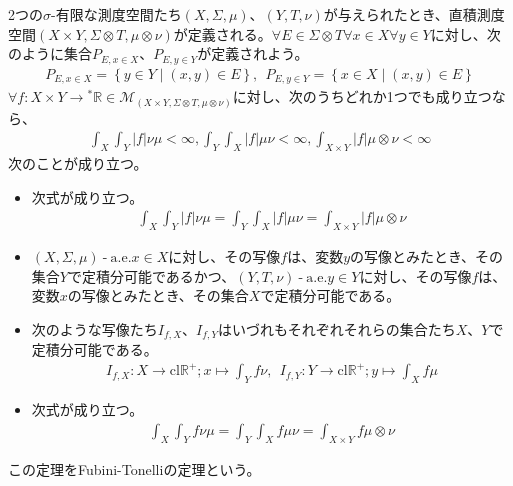 \documentclass[dvipdfmx]{jsarticle}
\begin{document}
\begin{thm}\label{4.6.4.5}
2つの$\sigma$-有限な測度空間たち$(X,\varSigma,\mu)$、$(Y,T,\nu)$が与えられたとき、直積測度空間$(X \times Y,\varSigma \otimes T,\mu \otimes \nu)$が定義される。$\forall E \in \varSigma \otimes T\forall x \in X\forall y \in Y$に対し、次のように集合$P_{E,x \in X}$、$P_{E,y \in Y}$が定義されよう。
\begin{align*}
P_{E,x \in X} = \left\{ y \in Y \middle| (x,y) \in E \right\},\ \ P_{E,y \in Y} = \left\{ x \in X \middle| (x,y) \in E \right\}
\end{align*}
$\forall f:X \times Y \rightarrow{}^{*}\mathbb{R} \in \mathcal{M}_{(X \times Y,\varSigma \otimes T,\mu \otimes \nu)}$に対し、次のうちどれか1つでも成り立つなら、
\begin{align*}
\int_{X} {\int_{Y} {|f|\nu}\mu} < \infty,\int_{Y} {\int_{X} {|f|\mu}\nu} < \infty,\int_{X \times Y} {|f|\mu \otimes \nu} < \infty
\end{align*}
次のことが成り立つ。
\begin{itemize}
\item
  次式が成り立つ。
\begin{align*}
\int_{X} {\int_{Y} {|f|\nu}\mu} = \int_{Y} {\int_{X} {|f|\mu}\nu} = \int_{X \times Y} {|f|\mu \otimes \nu}
\end{align*}
\item
  $(X,\varSigma,\mu) \ \text{-} \ \mathrm{a.e.}x \in X$に対し、その写像$f$は、変数$y$の写像とみたとき、その集合$Y$で定積分可能であるかつ、$(Y,T,\nu) \ \text{-} \ \mathrm{a.e.}y \in Y$に対し、その写像$f$は、変数$x$の写像とみたとき、その集合$X$で定積分可能である。
\item
  次のような写像たち$I_{f,X}$、$I_{f,Y}$はいづれもそれぞれそれらの集合たち$X$、$Y$で定積分可能である。
\begin{align*}
I_{f,X}:X \rightarrow \mathrm{cl}\mathbb{R}^{+};x \mapsto \int_{Y} {f\nu},\ \ I_{f,Y}:Y \rightarrow \mathrm{cl}\mathbb{R}^{+};y \mapsto \int_{X} {f\mu}
\end{align*}
\item
  次式が成り立つ。
\begin{align*}
\int_{X} {\int_{Y} {f\nu}\mu} = \int_{Y} {\int_{X} {f\mu}\nu} = \int_{X \times Y} {f\mu \otimes \nu}
\end{align*}
\end{itemize}
この定理をFubini-Tonelliの定理という。
\end{thm}
\end{document}

